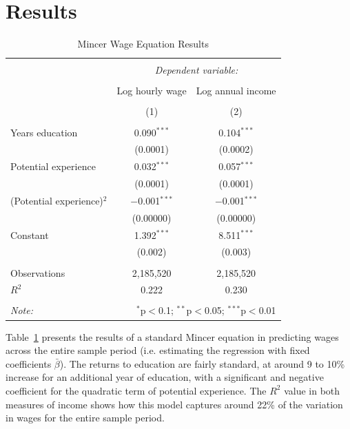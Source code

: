 \documentclass[notitlepage,12pt]{article}
\newcommand{\1}[1]{\ensuremath{\mathbb{1}\left( #1 \right)}}               %
\begin{document}
\section{Results}
\label{results}

\begin{table}[h!]
\centering
\caption{Mincer Wage Equation Results}
\label{tab:mincerresults}
\begin{tabular}{@{\extracolsep{5pt}}lcc} 
\\[-1.8ex]\hline 
\hline \\[-1.8ex] 
 & \multicolumn{2}{c}{\textit{Dependent variable:}} \\ 
\cline{2-3} 
\\[-1.8ex] & Log hourly wage & Log annual income \\ 
\\[-1.8ex] & (1) & (2)\\ 
\hline \\[-1.8ex] 
 Years education & 0.090$^{***}$ & 0.104$^{***}$ \\ 
  & (0.0001) & (0.0002) \\ 
  Potential experience & 0.032$^{***}$ & 0.057$^{***}$ \\ 
  & (0.0001) & (0.0001) \\ 
  (Potential experience)$^2$ & $-$0.001$^{***}$ & $-$0.001$^{***}$ \\ 
  & (0.00000) & (0.00000) \\ 
  Constant & 1.392$^{***}$ & 8.511$^{***}$ \\ 
  & (0.002) & (0.003) \\ 
 \hline \\[-1.8ex] 
Observations & 2,185,520 & 2,185,520 \\ 
$R^{2}$ & 0.222 & 0.230 \\
\hline 
\hline \\[-1.8ex] 
\textit{Note:}  & \multicolumn{2}{r}{$^{*}$p$<$0.1; $^{**}$p$<$0.05; $^{***}$p$<$0.01} \\ 
\end{tabular} 
\end{table}
Table~\ref{tab:mincerresults} presents the results of a standard Mincer equation in predicting wages across the entire sample period (i.e. estimating the regression with fixed coefficients $\bar{\beta}$).  The returns to education are fairly standard, at around 9 to 10\% increase for an additional year of education, with a significant and negative coefficient for the quadratic term of potential experience.  The $R^2$ value in both measures of income shows how this model captures around 22\% of the variation in wages for the entire sample period.
\end{document}
